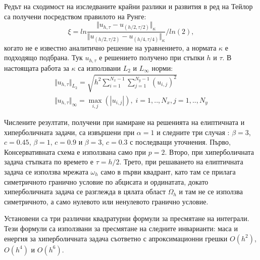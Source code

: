 \documentclass[a5paper]{article}
\theoremstyle{remark}
\begin{document}
\begin{normalsize}
Редът на сходимост на изследваните крайни разлики и развития в ред на Тейлор са получени посредством правилото на Рунге:
\begin{equation}\label{Runge}
\xi = ln  \frac{\Vert u_{h,\tau} - u_{(h/2,\tau/2)} \Vert_\kappa } {\Vert  u_{(h/2,\tau/2)} - u_{(h/4,\tau/4)} \Vert_\kappa  } / ln(2),
\end{equation}
когато не е известно аналитично решение на уравнението, а нормата $\kappa$ е подходящо подбрана. Тук $u_{h,\tau}$ е решението получено при стъпки $h$ и $\tau$. В настоящата работа за $\kappa$ са използвани $L_2$ и $L_\infty$ норми:
\begin{align*}
\Vert u_{h,\tau} \Vert_{L_2} = \sqrt{ h^2 \sum_{i=1}^{N_x-1} \sum_{j=1}^{N_y-1}  (u_{i,j})^2 } \\
\Vert u_{h,\tau} \Vert_{\infty} = \max_{i,j}(|u_{i,j}|), \; i=1,..,N_x, j=1,..,N_y
\end{align*}

Числените резултати, получени при намиране на решенията на елиптичната и хиперболичната задачи, са извършени при $\alpha = 1$ и следните три случая : $\beta = 3$, $c=0.45$, $\beta = 1$, $c=0.9$ и $\beta = 3$, $c=0.3$ с последващи уточнения. Първо, Консервативната схема е използвана само при $p=2$. Второ, при хиперболичната задача стъпката по времето е $\tau = h/2$. Трето, при решаването на елиптичната задача се използва мрежата $\omega_h$ само в първи квадрант, като там се прилага симетричното гранично условие по абцисата и ординатата, докато хиперболичната задача се разглежда в цялата област $\Omega_h$ и там не се използва симетричното, а само нулевото или ненулевото гранично условие.

Установени са три различни квадратурни формули за пресмятане на интеграли. Тези формули са използвани за пресмятане на следните инварианти: маса и енергия за хиперболичната задача съответно с апроксимационни грешки $O(h^2)$, $O(h^4)$ и $O(h^6)$. 


\end{normalsize}
\end{document}
